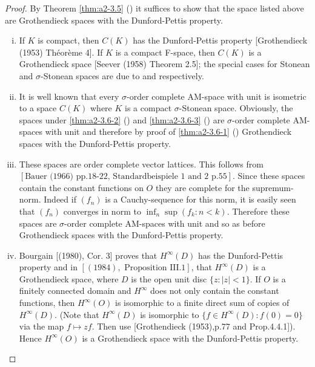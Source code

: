 \begin{proof}
By Theorem \ref{thm:a2-3.5} () it suffices to show that the space listed above are Grothendieck spaces with the Dunford-Pettis property.
\begin{enumerate}[(i)]
\item 
If $K$ is compact, then $C(K)$ has the Dunford-Pettis property [Grothendieck (1953) Théorème 4].
If $K$ is a compact F-space, then $C(K)$ is a Grothendieck space [Seever (1958) Theorem 2.5]; the special cases for Stonean and $\sigma$-Stonean spaces are due to \citet[Théorème 9]{grothendieck:1953} and \citet{ando:1961} respectively.
 
\item 
It is well known that every $\sigma$-order complete AM-space with unit is isometric to a space $C(K)$ where $K$ is a compact $\sigma$-Stonean space.
Obviously, the spaces under 
\ref{thm:a2-3.6-2} () and \ref{thm:a2-3.6-3} () are $\sigma$-order complete AM-spaces with unit and therefore by 
proof of \ref{thm:a2-3.6-1} () Grothendieck spaces with the Dunford-Pettis property.
 
\item
These spaces are order complete vector lattices.
This follows from $[\text{Bauer (1966) pp.18-22, Standardbeispiele 1 and 2 p.55}]$.
Since these spaces contain the constant functions on $O$ they are complete for the supremum-norm.
Indeed if $(f_n)$ is a Cauchy-sequence for this norm, it is easily seen that $(f_n)$ converges in norm to $\inf_n \sup(f_k \colon n < k)$.
Therefore these spaces are $\sigma$-order complete AM-spaces with unit and so as before Grothendieck spaces with the Dunford-Pettis property.
\item 
Bourgain [(1980), Cor. 3] proves that $H^{\infty}(D)$ has the Dunford-Pettis property and in $[(1984), \text{ Proposition III.1}]$, that $H^{\infty}(D)$ is a
Grothendieck space, where $D$ is the open unit disc $\{z \colon |z| < 1\}$.
If $O$ is a finitely connected domain and $H^{\infty}$ does not only contain the constant functions, then $H^{\infty}(O)$ is isomorphic to a finite direct sum of copies of $H^{\infty}(D)$.
(Note that $H^{\infty}(D)$ is isomorphic to $\{f \in H^{\infty}(D) \colon f(0) = 0\}$ via the map $f \mapsto zf$.
Then use [Grothendieck (1953),p.77 and Prop.4.4.1]).
Hence $H^{\infty}(O)$ is a Grothendieck space with the Dunford-Pettis property.
\end{enumerate}
\end{proof}


